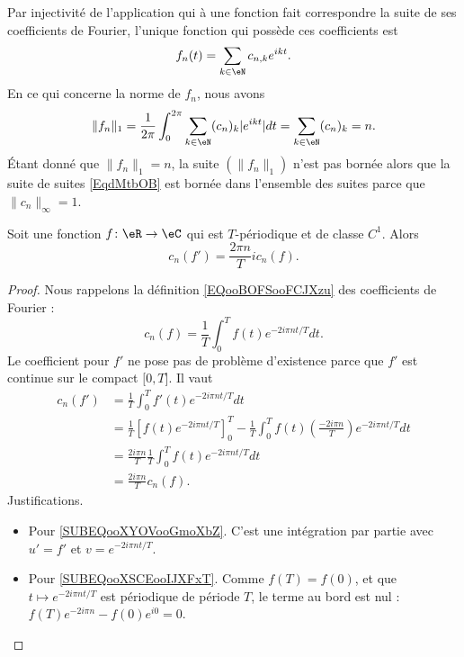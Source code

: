 Par injectivité de l'application qui à une fonction fait correspondre la suite de ses coefficients de Fourier, l'unique fonction qui possède ces coefficients est
\begin{equation}
	f_n(t)=\sum_{k\in \eN}c_{n,k} e^{ikt}.
\end{equation}
En ce qui concerne la norme de \( f_n\), nous avons
\begin{equation}
	\| f_n \|_1=\frac{1}{ 2\pi }\int_0^{2\pi}\sum_{k\in \eN}(c_n)_k|  e^{ikt} |dt=\sum_{k\in \eN}(c_n)_k=n.
\end{equation}
Étant donné que \( \| f_n \|_1=n\), la suite \( (\| f_n \|_1)\) n'est pas bornée alors que la suite de suites \eqref{EqdMtbOB} est bornée dans l'ensemble des suites parce que \( \| c_n \|_{\infty}=1\).

\begin{lemma}       \label{LEMooPUJDooKRBTaU}
	Soit une fonction \( f\colon \eR\to \eC\) qui est \( T\)-périodique et de classe \( C^1\). Alors
	\begin{equation}
		c_n(f')=\frac{ 2\pi n }{ T }ic_n(f).
	\end{equation}
\end{lemma}

\begin{proof}
	Nous rappelons la définition \eqref{EQooBOFSooFCJXzu} des coefficients de Fourier :
	\begin{equation}
		c_n(f)=\frac{1}{ T }\int_0^Tf(t) e^{-2 i \pi n t/T}dt.
	\end{equation}
	Le coefficient pour \( f'\) ne pose pas de problème d'existence parce que \( f'\) est continue sur le compact \( \mathopen[ 0 , T \mathclose]\). Il vaut
	\begin{subequations}
		\begin{align}
			c_n(f') & =\frac{1}{ T }\int_0^Tf'(t) e^{-2 i \pi n t/T}dt                                                                                                                   \\
			        & =\frac{1}{ T }\left[ f(t) e^{-2i\pi nt/T} \right]_0^T-\frac{1}{ T }\int_0^Tf(t)\left( \frac{ -2i\pi n }{ T } \right) e^{-2i\pi nt/T}dt \label{SUBEQooXYOVooGmoXbZ} \\
			        & =\frac{ 2i\pi n }{ T }\frac{1}{ T }\int_0^Tf(t) e^{-2i\pi nt/T}dt \label{SUBEQooXSCEooIJXFxT}                                                                      \\
			        & =\frac{ 2i\pi n }{ T }c_n(f).
		\end{align}
	\end{subequations}
	Justifications.
	\begin{itemize}
		\item Pour \eqref{SUBEQooXYOVooGmoXbZ}. C'est une intégration par partie avec \( u'=f'\) et \( v= e^{-2i\pi nt/T}\).
		\item Pour \eqref{SUBEQooXSCEooIJXFxT}. Comme \( f(T)=f(0)\), et que \( t\mapsto e^{-2i\pi nt/T}\) est périodique de période \( T\), le terme au bord est nul : \( f(T) e^{-2i\pi n}-f(0) e^{i0}=0\).
	\end{itemize}
\end{proof}

